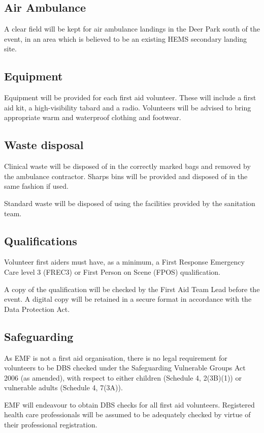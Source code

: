 \subsection{Air Ambulance}

A clear field will be kept for air ambulance landings in the Deer Park south of
the event, in an area which is believed to be an existing HEMS secondary landing
site.

\subsection{Equipment}
Equipment will be provided for each first aid volunteer. These will include a
first aid kit, a high-visibility tabard and a radio. Volunteers will be advised
to bring appropriate warm and waterproof clothing and footwear.

\subsection{Waste disposal}
Clinical waste will be disposed of in the correctly marked bags and
removed by the ambulance contractor. Sharps bins will be provided and
disposed of in the same fashion if used.

Standard waste will be disposed of using the facilities provided by the sanitation team.

\subsection{Qualifications}
Volunteer first aiders must have, as a minimum, a First Response Emergency Care
level 3 (FREC3) or First Person on Scene (FPOS) qualification.

A copy of the qualification will be checked by the First Aid Team Lead
before the event. A digital copy will be retained in a secure format in accordance
with the Data Protection Act.

\subsection{Safeguarding}

As EMF is not a first aid organisation, there is no legal requirement for
volunteers to be DBS checked under the Safeguarding Vulnerable Groups Act 2006
(as amended), with respect to either children (Schedule 4, 2(3B)(1)) or vulnerable
adults (Schedule 4, 7(3A)).

EMF will endeavour to obtain DBS checks for all first aid volunteers. Registered
health care professionals will be assumed to be adequately checked by virtue of
their professional registration.

